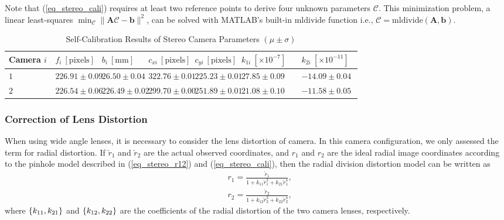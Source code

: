 \documentclass[10pt,letterpaper,journal,final,twoside,twocolumn,nofonttune]{IEEEtran}
\begin{document}
Note that (\ref{eq_stereo_cali}) requires at least two reference points to derive four unknown parameters $\bm{\mathcal{C}}$. This minimization problem, a linear least-squares $\min_{\bm{\mathcal{C}}}\lVert\bm{A}\bm{\mathcal{C}}-\bm{b}\rVert^2$, can be solved with MATLAB's built-in $\mathrm{mldivide}$ function i.e., $\bm{\mathcal{C}}=\mathrm{mldivide}(\bm{A},\bm{b})$.
\begin{table}[!t]
\centering
\renewcommand{\arraystretch}{1.1} 
\caption{Self-Calibration Results of Stereo Camera Parameters $(\mu \pm  \sigma)$}
\setlength{\tabcolsep}{3pt}
\begin{tabular}{p{0.1\linewidth}p{0.1\linewidth}p{0.1\linewidth}p{0.1\linewidth}p{0.1\linewidth}p{0.1\linewidth}p{0.1\linewidth}}
\toprule
\hfil Camera $i$&  \hfil $f_{i}\: [\text{pixels}]$ & \hfil $b_{i}\: [\text{mm}]$ & \hfil $c_{xi}\: [\text{pixels}]$ & \hfil $c_{yi}\: [\text{pixels}]$& \hfil $k_{1i}\:[\times 10^{-7}]$& \hfil $k_{2i}\:[\times 10^{-11}]$\\
\midrule
\hfil $1$ &     \hfil $226.91\pm 0.09$ & \hfil $26.50\pm 0.04$ & \hfil $322.76\pm 0.01$ & \hfil $225.23\pm 0.01$& \hfil $27.85\pm 0.09$& \hfil $-14.09\pm 0.04$\\
\hfil $2$ &    \hfil $226.54\pm 0.06$ & \hfil $226.49\pm 0.02$ & \hfil $299.70\pm 0.00$ & \hfil $251.89\pm 0.01$& \hfil $21.08\pm 0.10$& \hfil $-11.58\pm 0.05$\\
\bottomrule
\end{tabular}
\label{table_stereo}
\end{table}
\subsubsection{Correction of Lens Distortion}
When using wide angle lenses, it is necessary to consider the lens distortion of camera. In this camera configuration, we only assessed the term for radial distortion. If $\breve{r}_1$ and $\breve{r}_2$ are the actual observed coordinates, and $r_1$ and $r_2$ are the ideal radial image coordinates according to the pinhole model described in (\ref{eq_stereo_r12}) and (\ref{eq_stereo_cali}), then the radial division distortion model \cite{Fitzgibbon} can be written as
\begin{align}
\label{eq_stereo_r1}
&r_1=\frac{\breve{r}_1}{1+k_{11}\breve{r}_1^2 +k_{21}\breve{r}_1^4 },\\ 
\label{eq_stereo_r2}
&r_2=\frac{\breve{r}_2}{1+k_{12}\breve{r}_2^2 +k_{22}\breve{r}_2^4},
\end{align}
where $\set{k_{11}, k_{21}}$ and $\set{k_{12}, k_{22}}$ are the coefficients of the radial distortion of the two camera lenses, respectively.  
\end{document}
